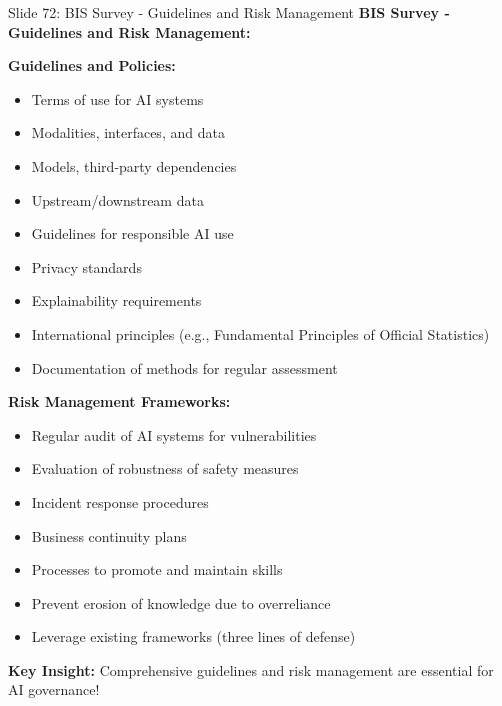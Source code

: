 \documentclass[8pt]{beamer}
\begin{document}
	\begin{frame}{Slide 72: BIS Survey - Guidelines and Risk Management}
		\fontsize{6.5}{7.5}\selectfont
		\textbf{BIS Survey - Guidelines and Risk Management:}
		
		\vspace{0.1cm}
		\textbf{Guidelines and Policies:}
		\begin{itemize}
			\item Terms of use for AI systems
			\item Modalities, interfaces, and data
			\item Models, third-party dependencies
			\item Upstream/downstream data
			\item Guidelines for responsible AI use
			\item Privacy standards
			\item Explainability requirements
			\item International principles (e.g., Fundamental Principles of Official Statistics)
			\item Documentation of methods for regular assessment
		\end{itemize}
		
		\vspace{0.1cm}
		\textbf{Risk Management Frameworks:}
		\begin{itemize}
			\item Regular audit of AI systems for vulnerabilities
			\item Evaluation of robustness of safety measures
			\item Incident response procedures
			\item Business continuity plans
			\item Processes to promote and maintain skills
			\item Prevent erosion of knowledge due to overreliance
			\item Leverage existing frameworks (three lines of defense)
		\end{itemize}
		
		\textcolor{myblue}{\textbf{Key Insight:}} Comprehensive guidelines and risk management are \textcolor{myblue}{essential for AI governance}!
	\end{frame}
	
\end{document}
